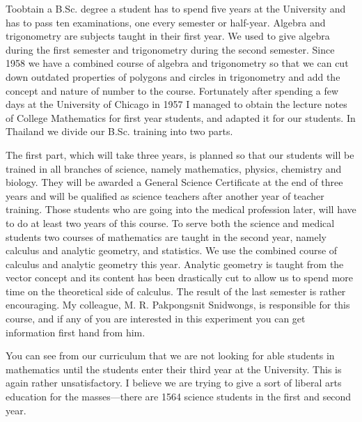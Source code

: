 \setcounter{pageoriginal}{154}
To\pageoriginale obtain a B.Sc. degree a student has to spend five years at the University and has to pass ten examinations, one every semester or half-year. Algebra and trigonometry are subjects taught in their first year. We used to give algebra during the first semester and trigonometry during the second semester. Since 1958 we have a combined course of algebra and trigonometry so that we can cut down outdated properties of polygons and circles in trigonometry and add the concept and nature of number to the course. Fortunately after spending a few days at the University of Chicago in 1957 I managed to obtain the lecture notes of College Mathematics for first year students, and adapted it for our students. In Thailand we divide our B.Sc. training into two parts.

The first part, which will take three years, is planned so that our students will be trained in all branches of science, namely mathematics, physics, chemistry and biology. They will be awarded a General Science Certificate at the end of three years and will be qualified as science teachers after another year of teacher training. Those students who are going into the medical profession later, will have to do at least two years of this course. To serve both the science and medical students two courses of mathematics are taught in the second year, namely calculus and analytic geometry, and statistics. We use the combined course of calculus and analytic geometry this year. Analytic geometry is taught from the vector concept and its content has been drastically cut to allow us to spend more time on the theoretical side of calculus. The result of the last semester is rather encouraging. My colleague, M. R. Pakpongsnit Snidwongs, is responsible for this course, and if any of you are interested in this experiment you can get information first hand from him.

You can see from our curriculum that we are not looking for able students in mathematics until the students enter their third year at the University. This is again rather unsatisfactory. I believe we are trying to give a sort of liberal arts education for the masses---there are 1564 science students in the first and second year.

